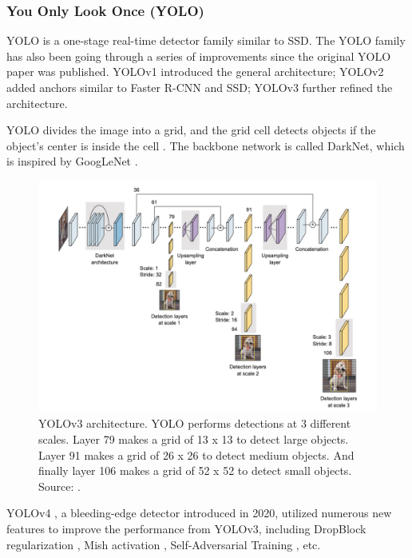 \documentclass[a4paper, 11pt, oneside]{article}
\begin{document}
\subsubsection{You Only Look Once (YOLO)}

YOLO is a one-stage real-time detector family similar to SSD. The YOLO family has also been going through a series of
improvements since the original YOLO paper was published. YOLOv1 \cite{redmon2016you} introduced the general
architecture; YOLOv2 \cite{redmon2017yolo9000} added anchors similar to Faster R-CNN and SSD; YOLOv3
\cite{redmon2018yolov3} further refined the architecture.

YOLO divides the image into a grid, and the grid cell detects objects if the object's center is inside the cell
\cite{redmon2016you}. The backbone network is called DarkNet, which is inspired by GoogLeNet
\cite{elgendy2020deep, redmon2016you}.

\begin{figure}[ht]
  \begin{center}
    \includegraphics[width=\textwidth]{yolov3.png}
  \end{center}
  \caption{YOLOv3 architecture. YOLO performs detections at 3 different scales. Layer 79 makes a grid of 13 x 13 to
  detect large objects. Layer 91 makes a grid of 26 x 26 to detect medium objects. And finally layer 106 makes a grid
  of 52 x 52 to detect small objects. Source: \cite{elgendy2020deep}.}
\end{figure}

YOLOv4 \cite{bochkovskiy2020yolov4}, a bleeding-edge detector introduced in 2020, utilized numerous new features to
improve the performance from YOLOv3, including DropBlock regularization \cite{ghiasi2018dropblock}, Mish activation
\cite{misra2019mish}, Self-Adversarial Training \cite{bochkovskiy2020yolov4}, etc.
\end{document}
